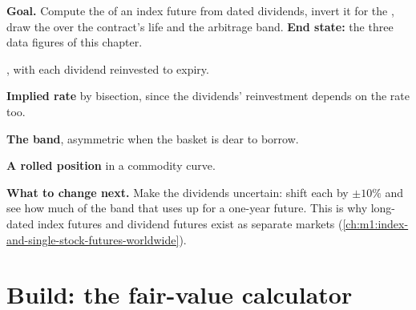 \begin{tutorial}
\textbf{Goal.} Compute the  of an index future from dated
dividends, invert it for the , draw the  over the
contract's life and the arbitrage band. \textbf{End state:} the three data
figures of this chapter.
\begin{tutsteps}
\item \textbf{}, with each dividend reinvested to expiry.
\label{lst:m1:basis-roll-and-delivery:fv}
\item \textbf{Implied rate} by bisection, since the dividends' reinvestment
depends on the rate too.
\label{lst:m1:basis-roll-and-delivery:implied}
\item \textbf{The band}, asymmetric when the basket is dear to borrow.
\label{lst:m1:basis-roll-and-delivery:band}
\item \textbf{A rolled position} in a commodity curve.
\label{lst:m1:basis-roll-and-delivery:rolled}
\end{tutsteps}
\textbf{What to change next.} Make the dividends uncertain: shift each by
$\pm 10\%$ and see how much of the band that uses up for a one-year future.
This is why long-dated index futures and dividend futures exist as separate
markets (\cref{ch:m1:index-and-single-stock-futures-worldwide}).
\end{tutorial}

\section{Build: the fair-value calculator}\label{bld:m1:basis-roll-and-delivery:fv}

